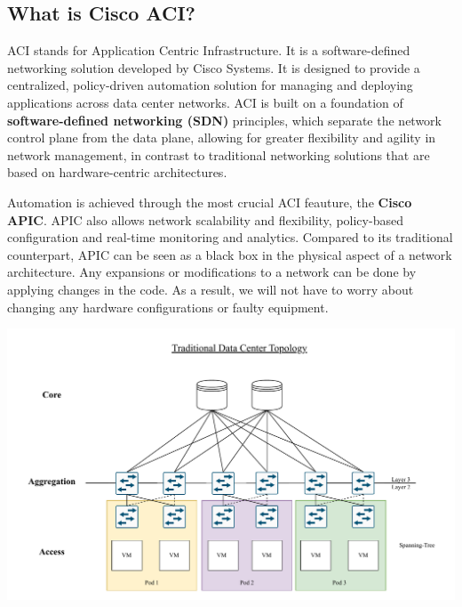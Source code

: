 \subsection{What is Cisco ACI?}
ACI stands for Application Centric Infrastructure. It is a software-defined networking solution developed by Cisco Systems. It is designed to provide a centralized, policy-driven automation solution for managing and deploying applications across data center networks. ACI is built on a foundation of \textbf{software-defined networking (SDN)} principles, which separate the network control plane from the data plane, allowing for greater flexibility and agility in network management, in contrast to traditional networking solutions that are based on hardware-centric architectures.

Automation is achieved through the most crucial ACI feauture, the \textbf{Cisco APIC}. APIC also allows network scalability and flexibility, policy-based configuration and real-time monitoring and analytics. Compared to its traditional counterpart, APIC can be seen as a black box in the physical aspect of a network architecture. Any expansions or modifications to a network can be done by applying changes in the code. As a result, we will not have to worry about changing any hardware configurations or faulty equipment.

\begin{center}
    \includegraphics[scale=0.6]{Pics/traditional_topology.pdf}
\end{center}

